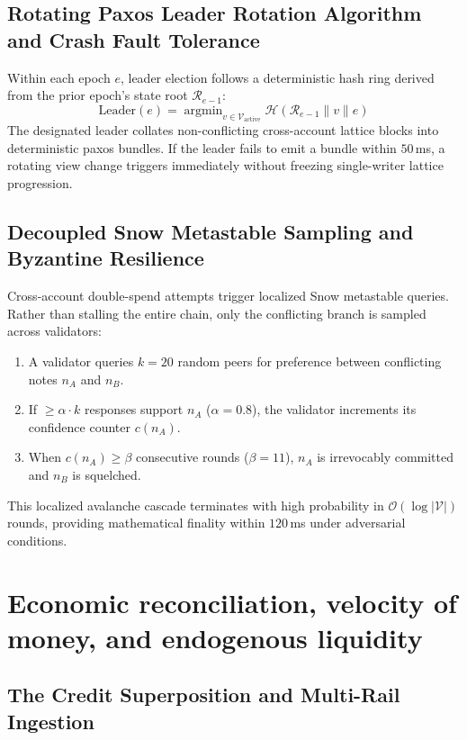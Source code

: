 \documentclass[a4paper,11pt,twoside,parskip=half-,headings=small]{scrartcl}
\begin{document}
\subsection{Rotating Paxos Leader Rotation Algorithm and Crash Fault Tolerance}

Within each epoch $e$, leader election follows a deterministic hash ring derived from the
prior epoch's state root $\mathcal{R}_{e-1}$:
\begin{equation}
\text{Leader}(e) = \operatorname{argmin}_{v \in \mathcal{V}_{\text{active}}} \mathcal{H}(\mathcal{R}_{e-1} \parallel v \parallel e)
\end{equation}
The designated leader collates non-conflicting cross-account lattice blocks into deterministic
paxos bundles. If the leader fails to emit a bundle within $50$\,ms, a rotating view change
triggers immediately without freezing single-writer lattice progression.

\subsection{Decoupled Snow Metastable Sampling and Byzantine Resilience}

Cross-account double-spend attempts trigger localized Snow metastable queries. Rather than
stalling the entire chain, only the conflicting branch is sampled across validators:
\begin{enumerate}
  \item A validator queries $k=20$ random peers for preference between conflicting notes $n_A$ and $n_B$.
  \item If $\ge \alpha \cdot k$ responses support $n_A$ ($\alpha = 0.8$), the validator increments its confidence counter $c(n_A)$.
  \item When $c(n_A) \ge \beta$ consecutive rounds ($\beta = 11$), $n_A$ is irrevocably committed and $n_B$ is squelched.
\end{enumerate}
This localized avalanche cascade terminates with high probability in $\mathcal{O}(\log |\mathcal{V}|)$
rounds, providing mathematical finality within $120$\,ms under adversarial conditions.

\section{Economic reconciliation, velocity of money, and endogenous liquidity}
\label{sec:econ}

\subsection{The Credit Superposition and Multi-Rail Ingestion}
\end{document}
